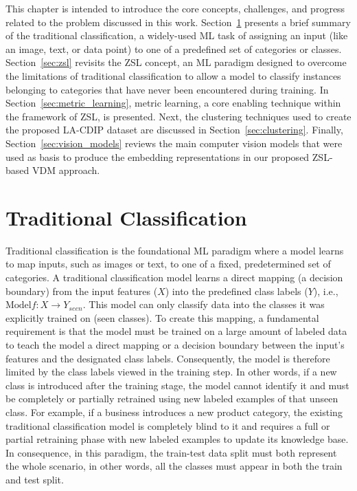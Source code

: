 
This chapter is intended to introduce the core concepts, challenges, and progress related to the problem discussed in this work. Section~\ref{sec_traditional_classification} presents a brief summary of the traditional classification, a widely-used \gls{ML} task of assigning an input (like an image, text, or data point) to one of a predefined set of categories or classes. Section~\ref{sec:zsl} revisits the \gls{ZSL} concept, an \gls{ML} paradigm designed to overcome the limitations of traditional classification to allow a model to classify instances belonging to categories that have never been encountered during training. In Section~\ref{sec:metric_learning}, metric learning,  a core enabling technique within the framework of \gls{ZSL}, is presented. Next, the clustering techniques used to create the proposed \acrfull{LA-CDIP} dataset are discussed in Section~\ref{sec:clustering}. Finally, Section~\ref{sec:vision_models} reviews the main computer vision models that were used as basis to produce the embedding representations in our proposed \gls{ZSL}-based \gls{VDM} approach.


\section{Traditional Classification} \label{sec_traditional_classification}

Traditional classification is the foundational \gls{ML} paradigm where a model learns to map inputs, such as images or text, to one of a fixed, predetermined set of categories. A traditional classification model learns a direct mapping (a decision boundary) from the input features ($X$) into the predefined class labels ($Y$), i.e., $\text{Model} f : X \rightarrow Y_{seen}$. This model can only classify data into the classes it was explicitly trained on (seen classes). To create this mapping, a fundamental requirement is that the model must be trained on a large amount of labeled data to teach the model a direct mapping or a decision boundary between the input's features and the designated class labels. Consequently, the model is therefore limited by the class labels viewed in the training step. In other words, if a new class is introduced after the training stage, the model cannot identify it and must be completely or partially retrained using new labeled examples of that unseen class. For example, if a business introduces a new product category, the existing traditional classification model is completely blind to it and requires a full or partial retraining phase with new labeled examples to update its knowledge base. In consequence, in this paradigm, the train-test data split must both represent the whole scenario, in other words, all the classes must appear in both the train and test split.

